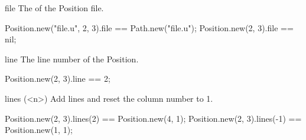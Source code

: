 \begin{urbiscriptapi}
\item[file]
  The  of the Position file.
\begin{urbiassert}
Position.new("file.u", 2, 3).file == Path.new("file.u");
Position.new(2, 3).file == nil;
\end{urbiassert}

\item[line]
  The line number of the Position.
\begin{urbiassert}
Position.new(2, 3).line == 2;
\end{urbiassert}

\item[lines](<n>)%
  Add  lines and reset the column number to 1.
\begin{urbiassert}
Position.new(2, 3).lines(2)  == Position.new(4, 1);
Position.new(2, 3).lines(-1) == Position.new(1, 1);
\end{urbiassert}

\end{urbiscriptapi}


